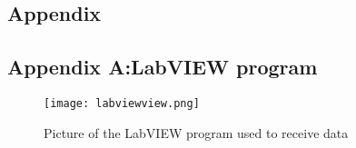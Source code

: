 \begin{appendices}
\chapter{Appendix}
\newpage
\section{Appendix A:LabVIEW program}
\begin{figure}
  \texttt{[image: labviewview.png]}
  \caption{Picture of the LabVIEW program used to receive data}
  \label{app:labviewview}
\end{figure}

\end{appendices}
